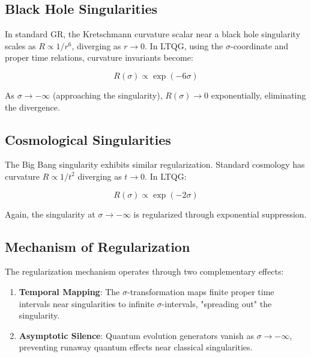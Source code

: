 \documentclass[12pt,a4paper]{article}
\begin{document}
\subsection{Black Hole Singularities}

In standard GR, the Kretschmann curvature scalar near a black hole singularity scales as $R \propto 1/r^6$, diverging as $r \to 0$. In LTQG, using the $\sigma$-coordinate and proper time relations, curvature invariants become:

\begin{equation}
R(\sigma) \propto \exp(-6\sigma)
\label{eq:regularized_curvature}
\end{equation}

As $\sigma \to -\infty$ (approaching the singularity), $R(\sigma) \to 0$ exponentially, eliminating the divergence.

\subsection{Cosmological Singularities}

The Big Bang singularity exhibits similar regularization. Standard cosmology has curvature $R \propto 1/t^2$ diverging as $t \to 0$. In LTQG:

\begin{equation}
R(\sigma) \propto \exp(-2\sigma)
\end{equation}

Again, the singularity at $\sigma \to -\infty$ is regularized through exponential suppression.

\subsection{Mechanism of Regularization}

The regularization mechanism operates through two complementary effects:

\begin{enumerate}
\item \textbf{Temporal Mapping}: The $\sigma$-transformation maps finite proper time intervals near singularities to infinite $\sigma$-intervals, "spreading out" the singularity.

\item \textbf{Asymptotic Silence}: Quantum evolution generators vanish as $\sigma \to -\infty$, preventing runaway quantum effects near classical singularities.
\end{enumerate}
\end{document}
